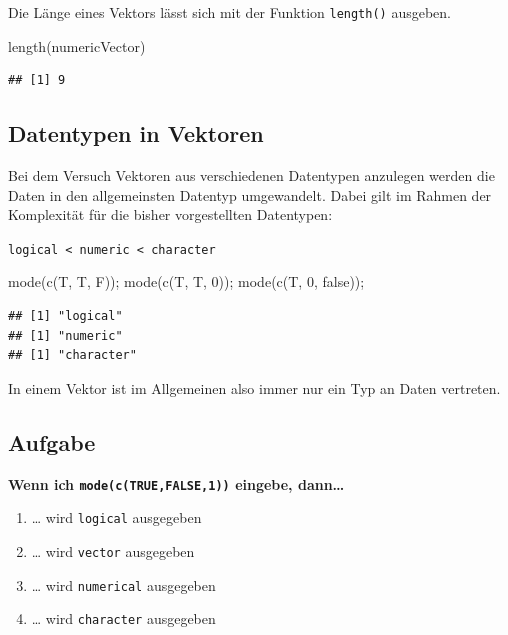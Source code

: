 \documentclass[
]{book}
\newenvironment{Shaded}{\begin{snugshade}}{\end{snugshade}}
\newcommand{\DecValTok}[1]{\textcolor[rgb]{0.00,0.00,0.81}{#1}}
\newcommand{\FunctionTok}[1]{\textcolor[rgb]{0.00,0.00,0.00}{#1}}
\newcommand{\NormalTok}[1]{#1}
\newcommand{\StringTok}[1]{\textcolor[rgb]{0.31,0.60,0.02}{#1}}
\providecommand{\tightlist}{%
  \setlength{\itemsep}{0pt}\setlength{\parskip}{0pt}}
\begin{document}
Die Länge eines Vektors lässt sich mit der Funktion \texttt{length()} ausgeben.

\begin{Shaded}
\begin{Highlighting}[]
\FunctionTok{length}\NormalTok{(numericVector)}
\end{Highlighting}
\end{Shaded}

\begin{verbatim}
## [1] 9
\end{verbatim}

\hypertarget{datentypen-in-vektoren}{%
\subsection{Datentypen in Vektoren}\label{datentypen-in-vektoren}}

Bei dem Versuch Vektoren aus verschiedenen Datentypen anzulegen werden die Daten in den allgemeinsten Datentyp umgewandelt. Dabei gilt im Rahmen der Komplexität für die bisher vorgestellten Datentypen:

\texttt{logical\ \textless{}\ numeric\ \textless{}\ character}

\begin{Shaded}
\begin{Highlighting}[]
\FunctionTok{mode}\NormalTok{(}\FunctionTok{c}\NormalTok{(T, T, F));}
\FunctionTok{mode}\NormalTok{(}\FunctionTok{c}\NormalTok{(T, T, }\DecValTok{0}\NormalTok{));}
\FunctionTok{mode}\NormalTok{(}\FunctionTok{c}\NormalTok{(T, }\DecValTok{0}\NormalTok{, }\StringTok{\textquotesingle{}false\textquotesingle{}}\NormalTok{));}
\end{Highlighting}
\end{Shaded}

\begin{verbatim}
## [1] "logical"
## [1] "numeric"
## [1] "character"
\end{verbatim}

In einem Vektor ist im Allgemeinen also immer nur ein Typ an Daten vertreten.

\hypertarget{aufgabe-2}{%
\subsection{Aufgabe}\label{aufgabe-2}}

\textbf{Wenn ich \texttt{mode(c(\textquotesingle{}TRUE\textquotesingle{},FALSE,1))} eingebe, dann\ldots{}}

\begin{enumerate}
\def\labelenumi{\Alph{enumi})}
\tightlist
\item
  \ldots{} wird \texttt{logical} ausgegeben
\item
  \ldots{} wird \texttt{vector} ausgegeben
\item
  \ldots{} wird \texttt{numerical} ausgegeben
\item
  \ldots{} wird \texttt{character} ausgegeben
\end{enumerate}
\end{document}
